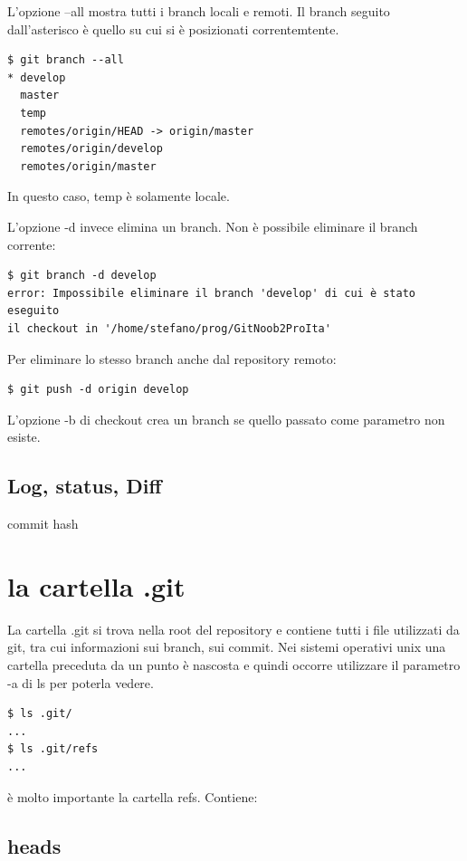 \documentclass{article} \usepackage[textwidth=18cm,textheight=18cm]{geometry}
\begin{document}
L'opzione --all mostra tutti i branch locali e remoti. Il branch seguito
dall'asterisco è quello su cui si è posizionati correntemtente.

\begin{verbatim}
$ git branch --all
* develop
  master
  temp
  remotes/origin/HEAD -> origin/master
  remotes/origin/develop
  remotes/origin/master
\end{verbatim}

In questo caso, temp è solamente locale.

L'opzione -d invece elimina un branch. Non è possibile eliminare il branch corrente:

\begin{verbatim}
$ git branch -d develop
error: Impossibile eliminare il branch 'develop' di cui è stato eseguito 
il checkout in '/home/stefano/prog/GitNoob2ProIta'
\end{verbatim}

Per eliminare lo stesso branch anche dal repository remoto:

\begin{verbatim}
$ git push -d origin develop
\end{verbatim}

L'opzione -b di checkout crea un branch se quello passato come parametro non
esiste.

\subsection{Log, status, Diff}

commit hash

\section{la cartella .git}

La cartella .git si trova nella root del repository e contiene tutti i file
utilizzati da git, tra cui informazioni sui branch, sui commit. Nei sistemi
operativi unix una cartella preceduta da un punto è nascosta e quindi occorre
utilizzare il parametro -a di ls per poterla vedere.

\begin{verbatim}
$ ls .git/
...
$ ls .git/refs
...
\end{verbatim}

è molto importante la cartella refs. Contiene:

\subsection{heads}
\end{document}
